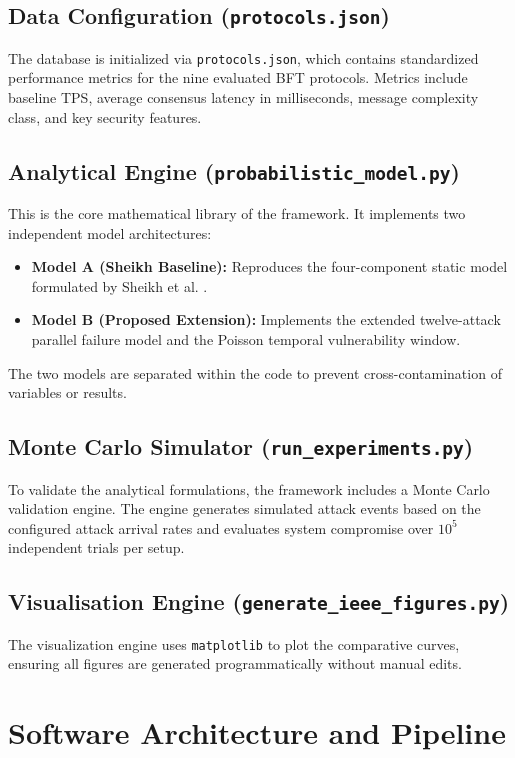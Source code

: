 \documentclass[12pt, oneside, a4paper]{report}
\theoremstyle{definition}
\theoremstyle{remark}
\begin{document}
\subsection{Data Configuration (\texttt{protocols.json})}
The database is initialized via \texttt{protocols.json}, which contains standardized performance metrics for the nine evaluated BFT protocols. Metrics include baseline TPS, average consensus latency in milliseconds, message complexity class, and key security features.

\subsection{Analytical Engine (\texttt{probabilistic\_model.py})}
This is the core mathematical library of the framework. It implements two independent model architectures:
\begin{itemize}
  \item \textbf{Model A (Sheikh Baseline):} Reproduces the four-component static model formulated by Sheikh et al. \cite{sheikh2020}.
  \item \textbf{Model B (Proposed Extension):} Implements the extended twelve-attack parallel failure model and the Poisson temporal vulnerability window.
\end{itemize}
The two models are separated within the code to prevent cross-contamination of variables or results.

\subsection{Monte Carlo Simulator (\texttt{run\_experiments.py})}
To validate the analytical formulations, the framework includes a Monte Carlo validation engine. The engine generates simulated attack events based on the configured attack arrival rates and evaluates system compromise over $10^5$ independent trials per setup.

\subsection{Visualisation Engine (\texttt{generate\_ieee\_figures.py})}
The visualization engine uses \texttt{matplotlib} to plot the comparative curves, ensuring all figures are generated programmatically without manual edits.

\section{Software Architecture and Pipeline}
\label{sec:sf:pipeline}
\end{document}

